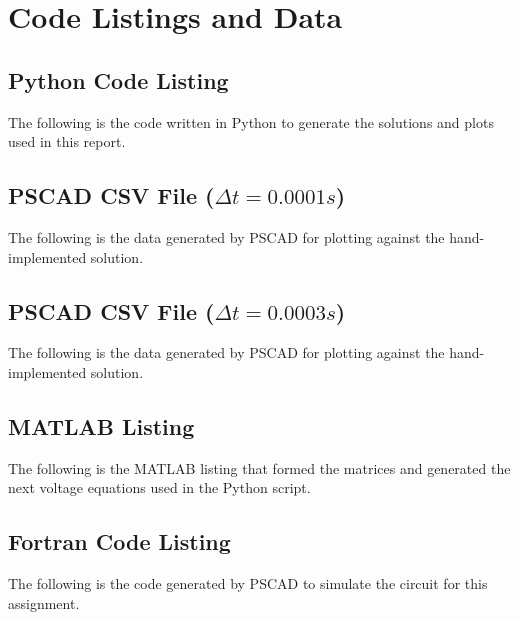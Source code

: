 \documentclass[10pt, oneside, letterpaper]{article}
\begin{document}
\newpage
\section{Code Listings and Data}

\subsection{Python Code Listing}
\label{code-listing-python}
The following is the code written in Python to generate the solutions and plots used in this report.


\subsection{PSCAD CSV File ($\Delta{}t = 0.0001s$)}
\label{data-listing-pscad-0p0001}
The following is the data generated by PSCAD for plotting against the hand-implemented solution.


\subsection{PSCAD CSV File ($\Delta{}t = 0.0003s$)}
\label{data-listing-pscad-0p0003}
The following is the data generated by PSCAD for plotting against the hand-implemented solution.


\subsection{MATLAB Listing}
\label{code-listing-matlab}
The following is the MATLAB listing that formed the matrices and generated the next voltage equations used in the Python script. 


\subsection{Fortran Code Listing}
\label{code-listing-fortran}
The following is the code generated by PSCAD to simulate the circuit for this assignment.

\end{document}
